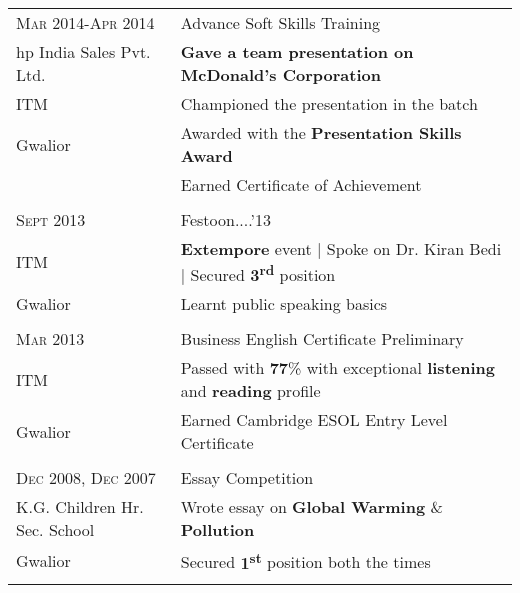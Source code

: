 \documentclass[a4paper,10pt]{article} %
\begin{document}
\begin{tabular}{ll}
\textsc{Mar 2014-Apr 2014} & Advance Soft Skills Training\\
hp India Sales Pvt. Ltd. & \textbf{Gave a team presentation on McDonald's Corporation}\\
ITM & Championed the presentation in the batch\\
Gwalior & Awarded with the \textbf{Presentation Skills Award}\\
& Earned Certificate of Achievement\\
&\\

\textsc{Sept} 2013 & Festoon....'13\\
ITM & \textbf{Extempore} event | Spoke on Dr. Kiran Bedi | Secured \textbf{3\textsuperscript{rd}} position\\
Gwalior & Learnt public speaking basics\\
&\\


\textsc{Mar} 2013 & Business English Certificate Preliminary\\
ITM & Passed with \textbf{77}\% with exceptional \textbf{listening} and \textbf{reading} profile\\
Gwalior & Earned Cambridge ESOL Entry Level Certificate\\
&\\


\textsc{Dec} 2008, \textsc{Dec} 2007 & Essay Competition\\
K.G. Children Hr. Sec. School & Wrote essay on \textbf{Global Warming} \& \textbf{Pollution}\\
Gwalior & Secured \textbf{1\textsuperscript{st}} position both the times\\
&\\
\end{tabular}

\end{document}
